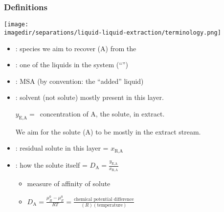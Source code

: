 \begin{frame}\frametitle{Definitions}
	\begin{center}
		\texttt{[image: \\imagedir/separations/liquid-liquid-extraction/terminology.png]}
	\end{center}
	
	\begin{itemize}
		\item	{\color{purple}{solute}}: species we aim to recover (A) from the {\color{purple}{feed}} 
		\item	{\color{purple}{feed or ``feed solvent''}}: one of the liquids in the system {\tiny (``{\color{purple}{carrier}}'')}
		\item	{\color{purple}{solvent}}: MSA (by convention: the ``added'' liquid)
		\item	{\color{purple}{extract}}: solvent (not solute) mostly present in this layer. 
		
				$y_\text{E,A} =$~concentration of A, the solute, in extract.
				
				We aim for the solute (A) to be mostly in the extract stream.
				
				
		\item	{\color{purple}{raffinate}}: residual solute in this layer = $x_\text{R,A}$
		\item	{\color{purple}{distribution}}: how the solute {\color{purple}{partitions}} itself = $D_\text{A} = \displaystyle \frac{y_\text{E,A}}{x_\text{R,A}}$
			\begin{itemize}
				\item	measure of affinity of solute
				\item	$D_\text{A} = \displaystyle \frac{\mu_R^0 - \mu_E^0}{RT} = \displaystyle \frac{\text{chemical potential difference}}{(R)(\text{temperature})}$	%
			\end{itemize}
	\end{itemize}	
\end{frame}

